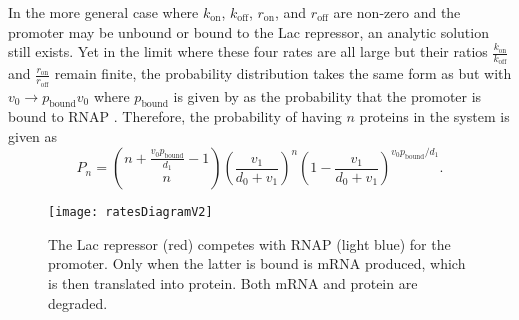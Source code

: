In the more general case where $k_\text{on}$, $k_\text{off}$, $r_\text{on}$, and
$r_\text{off}$ are non-zero and the promoter may be unbound or bound to the Lac
repressor, an analytic solution still exists. Yet in the limit where these four
rates are all large but their ratios $\frac{k_\text{on}}{k_\text{off}}$ and
$\frac{r_\text{on}}{r_\text{off}}$ remain finite, the probability distribution
takes the same form as \eref[eqGeneExpressionDistributionConstitutive] but with
$v_0 \to p_\text{bound} v_0$ where $p_\text{bound}$ is given by
\eref[eqRNAPboundEquilibrium] as the probability that the promoter is bound to
RNAP \cite{Shahrezaei2008}. Therefore, the probability of having $n$ proteins in
the system is given as
\begin{equation} \label{eqGeneExpressionDistributionFastRates}
P_n = \binom{n + \frac{v_0 p_\text{bound}}{d_1} - 1}{n} \left( \frac{v_1}{d_0 + v_1} \right)^{n} \left( 1 - \frac{v_1}{d_0 + v_1} \right)^{v_0 p_\text{bound}/d_1}.
\end{equation}

\begin{figure}[h!]
	\centering \texttt{[image: ratesDiagramV2]} 
	\caption{  The Lac repressor (red) competes with RNAP (light blue) for the promoter. Only when the latter is bound is mRNA produced, which is then translated into protein. Both mRNA and protein are degraded.}
	\label{figRatesDiagram}
\end{figure}